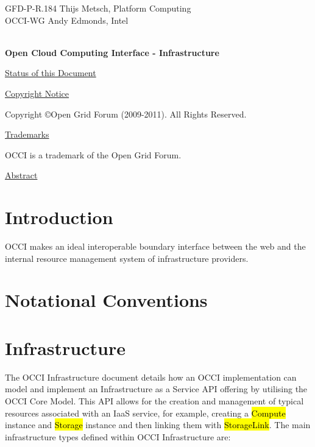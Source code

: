 \documentclass[10pt,a4paper]{article}
\begin{document}
\thispagestyle{empty}

GFD-P-R.184 \hfill  Thijs Metsch, Platform Computing\\
OCCI-WG \hfill  Andy Edmonds, Intel\\
\\

\vspace*{0.5in}

\begin{Large}
\textbf{Open Cloud Computing Interface - Infrastructure}
\end{Large}

\vspace*{0.5in}

\underline{Status of this Document}



\underline{Copyright Notice}

Copyright \copyright Open Grid Forum (2009-2011). All Rights Reserved.

\underline{Trademarks}

OCCI is a trademark of the Open Grid Forum.

\underline{Abstract}



\newpage
\tableofcontents
\newpage

\section{Introduction}


OCCI makes an ideal interoperable boundary interface between the web and the
internal resource management system of infrastructure providers.

\section{Notational Conventions}



\section{Infrastructure}
The OCCI Infrastructure document details how an OCCI implementation can model and implement an
Infrastructure as a Service API offering by utilising the OCCI Core Model. This API allows for the creation and management of typical resources associated with an IaaS service, for example, creating a \hl{Compute} instance and \hl{Storage} instance and then linking them with \hl{StorageLink}. The main infrastructure types defined within OCCI Infrastructure are:
\end{document}

